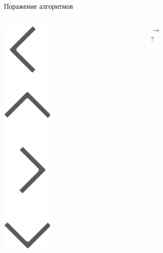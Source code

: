 \documentclass[aspectratio=169, professionalfonts]{beamer}
\begin{document}
\begin{frame}{Поражение алгоритмов}
\begin{columns}
\begin{column}{.07\linewidth}
            \includegraphics[width=\linewidth]{graphs/fig15_2.jpg}
        \end{column}
        \begin{column}{.13\linewidth}
            \centering
            \( \longrightarrow  \) \\
            \(? \)
        \end{column}
    \end{columns}
\end{frame}
\end{document}
